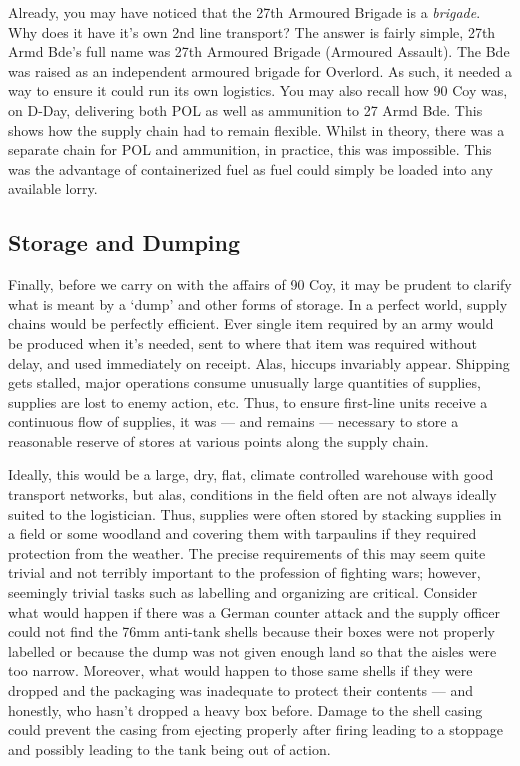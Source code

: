 \documentclass[noraggedright]{turabian-researchpaper}
\begin{document}
Already, you may have noticed that the 27th Armoured Brigade is a 
\textit{brigade}.  Why does it have it's own 2nd line transport?  The answer
is fairly simple, 27th Armd Bde's full name was 27th Armoured Brigade 
(Armoured Assault). %
The Bde was raised as an independent armoured brigade for Overlord.  As such,
it needed a way to ensure it could run its own logistics.  You may also recall
how 90 Coy was, on D-Day, delivering both POL as well as ammunition to 27 Armd
Bde.  This shows how the supply chain had to remain flexible.  Whilst in 
theory, there was a separate chain for POL and ammunition, in practice, this
was impossible.  This was the advantage of containerized fuel as fuel could 
simply be loaded into any available lorry.

\subsection{Storage and Dumping}
Finally, before we carry on with the affairs of 90 Coy, it may be prudent to 
clarify what is meant by a `dump' and other forms of storage.  In a perfect 
world, supply chains would be perfectly efficient.  Ever single item required
by an army would be produced when it's needed, sent to where that item was 
required without delay, and used immediately on receipt.  Alas, hiccups 
invariably appear.  Shipping gets stalled, major operations consume unusually
large quantities of supplies, supplies are lost to enemy action, etc.  Thus,
to ensure first-line units receive a continuous flow of supplies, it was ---
and remains --- necessary to store a reasonable reserve of stores at various
points along the supply chain.  

Ideally, this would be a large, dry, flat, 
climate controlled warehouse with good transport networks, but alas, 
conditions in the field often are not always ideally suited to the 
logistician.  Thus, supplies were often stored by stacking supplies in a 
field or some woodland and covering them with tarpaulins if they required
protection from the weather.  The precise requirements of this may seem quite
trivial and not terribly important to the profession of fighting wars; however, 
seemingly trivial tasks such as labelling and organizing are critical.  
Consider what would happen if there was a German counter attack and the supply
officer could not find the 76mm anti-tank shells because their boxes were
not properly labelled or because the dump was not given enough land so that 
the aisles were too narrow.  Moreover, what would happen to those same shells 
if they were dropped and the packaging was inadequate to protect their contents
--- and honestly, who hasn't dropped a heavy box before.  Damage to the shell
casing could prevent the casing from ejecting properly after firing leading to
a stoppage and possibly leading to the tank being out of action.  
\end{document}
